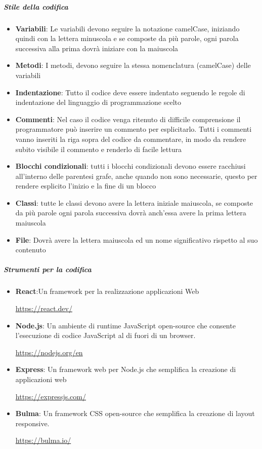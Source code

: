 \documentclass[12pt]{article}
\begin{document}
\subparagraph{Stile della codifica}
\label{StileCodifica}
\begin{itemize}
    \item \textbf{Variabili}: Le variabili devono seguire la notazione camelCase, iniziando quindi con la lettera minuscola e se composte da più parole, ogni parola successiva alla prima dovrà iniziare con la maiuscola
    \item \textbf{Metodi}: I metodi, devono seguire la stessa nomenclatura (camelCase) delle variabili
    \item \textbf{Indentazione}: Tutto il codice deve essere indentato seguendo le regole di indentazione del linguaggio di programmazione scelto
    \item \textbf{Commenti}: Nel caso il codice venga ritenuto di difficile comprensione il programmatore può inserire un commento per esplicitarlo. Tutti i commenti vanno inseriti la riga sopra del codice da commentare, in modo da rendere subito visibile il commento e renderlo di facile lettura
    \item \textbf{Blocchi condizionali}: tutti i blocchi condizionali devono essere racchiusi all'interno delle parentesi grafe, anche quando non sono necessarie, questo per rendere esplicito l'inizio e la fine di un blocco
    \item \textbf{Classi}: tutte le classi devono avere la lettera iniziale maiuscola, se composte da più parole ogni parola successiva dovrà anch'essa avere la prima lettera maiuscola
    \item \textbf{File}: Dovrà avere la lettera maiuscola ed un nome significativo rispetto al suo contenuto
\end{itemize}


\subparagraph{Strumenti per la codifica}
\begin{itemize}
    \item \textbf{React}:Un framework per la realizzazione applicazioni Web\\
          \begin{center}
              \url{https://react.dev/}
          \end{center}
    \item \textbf{Node.js}: Un ambiente di runtime JavaScript open-source che consente l'esecuzione di codice JavaScript al di fuori di un browser.
          \begin{center}
              \url{https://nodejs.org/en}
          \end{center}
    \item \textbf{Express}: Un framework web per Node.js che semplifica la creazione di applicazioni web\\
          \begin{center}
              \url{https://expressjs.com/}
          \end{center}
    \item \textbf{Bulma}: Un framework CSS open-source che semplifica la creazione di layout responsive.
          \begin{center}
              \url{https://bulma.io/}
          \end{center}
\end{itemize}
\end{document}
